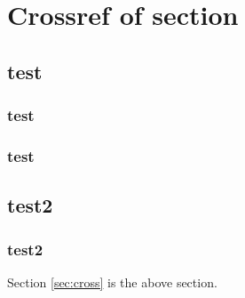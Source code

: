 \documentclass[12pt]{article}
\begin{document}
\section{Crossref of section}

\subsection{test}

\subsubsection{test}

\subsubsection{test}

\subsection{test2}

\subsubsection{test2}

Section \ref{sec:cross} is the above section.

% 
% 

\end{document}
